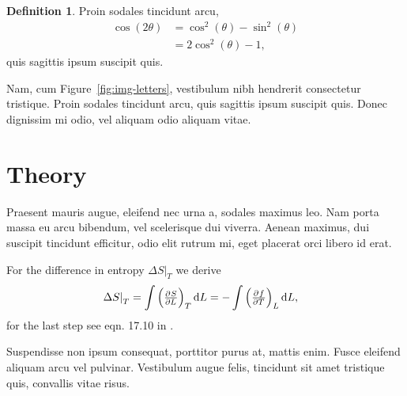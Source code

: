 \documentclass[
    a4paper,
    twocolumn,
    aps, pra,
    superscriptaddress,
    amsmath,amssymb
]{revtex4-2}
\newtheorem{theorem}{Theorem}[section]
\theoremstyle{definition}
\newtheorem{definition}[theorem]{Definition}
\newcommand{\fdOutside}[3]{\left(\pd{#1}{#2}\right)_{#3}}
\newcommand{\fd}[1]{\fdOutside #1}
\newcommand{\DeltaS}{\left.\Delta S\right|_T}
\begin{document}

\begin{definition}
    Proin sodales tincidunt arcu,
    \begin{align*}
        \cos(2\theta) &= \cos^2(\theta) - \sin^2(\theta)\\
        &= 2\cos^2(\theta) - 1,
    \end{align*}
    quis sagittis ipsum suscipit quis.
\end{definition}

Nam, cum Figure~\ref{fig:img-letters}, vestibulum nibh hendrerit
consectetur tristique. Proin sodales tincidunt arcu, quis sagittis ipsum suscipit quis. Donec
dignissim mi odio, vel aliquam odio aliquam vitae.

\section{Theory}

Praesent mauris augue, eleifend nec urna a, sodales maximus leo. Nam porta massa eu arcu
bibendum, vel scelerisque dui viverra. Aenean maximus, dui suscipit tincidunt efficitur, odio
elit rutrum mi, eget placerat orci libero id erat.

For the difference in entropy $ \DeltaS $ we derive
\begin{align*}
    \DeltaS &= \int \fd{SLT}\dif L = -\int \fd{fTL}\dif L,
\end{align*}
for the last step see eqn. 17.10 in \cite[][p. 193]{blundell}.

Suspendisse non ipsum consequat, porttitor
purus at, mattis enim. Fusce eleifend aliquam arcu vel pulvinar. Vestibulum augue felis,
tincidunt sit amet tristique quis, convallis vitae risus.
\end{document}

